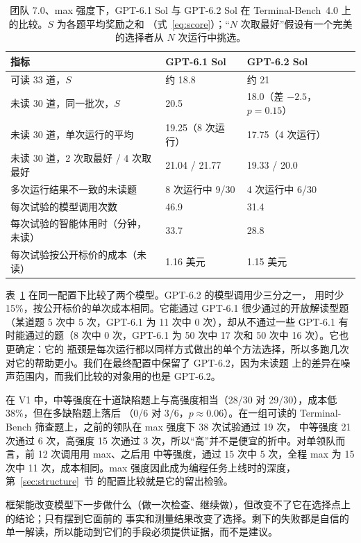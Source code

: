 \begin{table}[t]
\centering
\small
\caption{团队 7.0、max 强度下，GPT-6.1 Sol 与 GPT-6.2 Sol 在 Terminal-Bench~4.0 上的比较。$S$ 为各题平均奖励之和
（式~\eqref{eq:score}）；“$N$ 次取最好”假设有一个完美的选择者从 $N$ 次运行中挑选。}
\label{tab:models}
\begin{tabular}{@{}lll@{}}
\toprule
指标 & GPT-6.1 Sol & GPT-6.2 Sol \\
\midrule
可读 33 道，$S$ & 约 18.8 & 约 21 \\
未读 30 道，同一批次，$S$ & 20.5 & 18.0（差 $-2.5$，$p = 0.15$） \\
未读 30 道，单次运行的平均 & 19.25（8 次运行） & 17.75（4 次运行） \\
未读 30 道，2 次取最好 / 4 次取最好 & 21.04 / 21.77 & 19.33 / 20.0 \\
多次运行结果不一致的未读题 & 8 次运行中 9/30 & 4 次运行中 6/30 \\
每次试验的模型调用次数 & 46.9 & 31.4 \\
每次试验的智能体用时（分钟，未读） & 33.7 & 28.8 \\
每次试验按公开标价的成本（未读） & 1.16 美元 & 1.15 美元 \\
\bottomrule
\end{tabular}
\end{table}

表~\ref{tab:models} 在同一配置下比较了两个模型。GPT-6.2 的模型调用少三分之一，
用时少 15\%，按公开标价的单次成本相同。它能通过 GPT-6.1 很少通过的开放解读型题（某道题 5 次中 5 次，GPT-6.1 为 11 次中
0 次），却从不通过一些 GPT-6.1 有时能通过的题（8 次中 0 次，GPT-6.1 为 50 次中 17 次和 50 次中 16 次）。它也更确定：它的
瓶颈是每次运行都以同样方式做出的单个方法选择，所以多跑几次对它的帮助更小。我们在最终配置中保留了 GPT-6.2，因为未读题
上的差异在噪声范围内，而我们比较的对象用的也是 GPT-6.2。

在 V1 中，中等强度在十道缺陷题上与高强度相当（28/30 对 29/30），成本低 38\%，但在多缺陷题上落后
（0/6 对 3/6，$p \approx 0.06$）。在一组可读的 Terminal-Bench 筛查题上，之前的领队在 max 强度下 38 次试验通过 19 次，
中等强度 21 次通过 6 次，高强度 15 次通过 3 次，所以“高”并不是便宜的折中。对单领队而言，前 12 次调用用 max、之后用
中等强度，通过 15 次中 5 次，全程 max 为 15 次中 11 次，成本相同。max 强度因此成为编程任务上线时的深度，第~\ref{sec:structure}~节
的配置比较就是它的留出检验。

框架能改变模型下一步做什么（做一次检查、继续做），但改变不了它在选择点上的结论；只有摆到它面前的
事实和测量结果改变了选择。剩下的失败都是自信的单一解读，所以能动到它们的手段必须提供证据，而不是建议。
